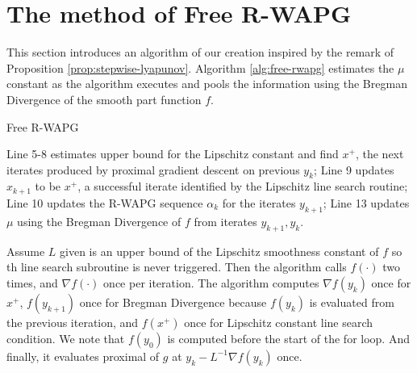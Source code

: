 \documentclass[12pt]{article}
\begin{document}
\section{The method of Free R-WAPG}\label{sec:free-rwapg}
    This section introduces an algorithm of our creation inspired by the remark of Proposition \ref{prop:stepwise-lyapunov}. 
    Algorithm \ref{alg:free-rwapg} estimates the $\mu$ constant as the algorithm executes and pools the information using the Bregman Divergence of the smooth part function $f$. 
    \begin{algorithm}
        \begin{algorithmic}[1]
        {\footnotesize
            \ENDWHILE
        \ENDFOR
        }
        \end{algorithmic}
        \caption{Free R-WAPG}
        \label{alg:free-rwapg}
    \end{algorithm}
    \par
    Line 5-8 estimates upper bound for the Lipschitz constant and find $x^+$, the next iterates produced by proximal gradient descent on previous $y_k$; 
    Line 9 updates $x_{k + 1}$ to be $x^+$, a successful iterate identified by the Lipschitz line search routine;
    Line 10 updates the R-WAPG sequence $\alpha_k$ for the iterates $y_{k + 1}$;
    Line 13 updates $\mu$ using the Bregman Divergence of $f$ from iterates $y_{k + 1}, y_k$. 
    \par
    Assume $L$ given is an upper bound of the Lipschitz smoothness constant of $f$ so th line search subroutine is never triggered. 
    Then the algorithm calls $f(\cdot)$ two times, and $\nabla f(\cdot)$ once per iteration. 
    The algorithm computes $\nabla f(y_k)$ once for $x^+$, $f(y_{k + 1})$ once for Bregman Divergence because $f(y_{k})$ is evaluated from the previous iteration, and $f(x^+)$ once for Lipschitz constant line search condition. 
    We note that $f(y_0)$ is computed before the start of the for loop. 
    And finally, it evaluates proximal of $g$ at $y_k - L^{-1}\nabla f(y_k)$ once. 
\end{document}
